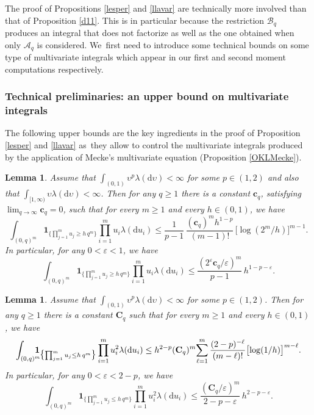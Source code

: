 \documentclass[10pt]{amsart}
\let\mathcal\mathscr
\newtheorem{lemma}[theorem]{Lemma}
\theoremstyle{definition}
\newcommand{\bc}{\boldsymbol{c}}
\newcommand{\dd}{\mathrm{d}}
\newcommand{\ind}{\mathbf{1}}
\newcommand{\cA}{{\ensuremath{\mathcal A}} }
\newcommand{\cB}{{\ensuremath{\mathcal B}} }
\newcommand{\bC}{{\ensuremath{\mathbf C}} }
\let\gep\varepsilon
\let\ups\upsilon
\begin{document}
The proof of Propositions \ref{lesper} and \ref{llavar} are technically more involved than that of Proposition \ref{d11}. This is in particular because the restriction $\cB_q$ produces an integral that does not factorize as well as the one obtained when only $\cA_q$ is considered. We~first need to introduce some technical bounds on some type of multivariate integrals which appear in our first and second moment computations respectively.

\subsubsection{Technical preliminaries: an upper bound on multivariate integrals}

The following upper bounds are the key ingredients in the proof of Proposition \ref{lesper} and \ref{llavar} as~they allow to control the multivariate integrals produced by the application of Mecke's multivariate equation (Proposition \ref{OKLMecke}).

\begin{lemma}
\label{lem:tailzzz1}
Assume that $\int_{(0,1)} \ups^p \lambda(\dd \ups) <\infty$
for some $p \in (1,2)$ and also that $\int_{[1,\infty)} \ups \lambda(\dd \ups)\!<\!\infty$. Then for any $q\!\geq\!1$ there is
a constant $\bc_q$, satisfying $\lim_{q\to\infty} \bc_q\!=\!0$,
such that for every $m\geq 1$ and every $h\in (0,1)$, we have
\begin{equation}
\label{firstline1}
\int_{(0,q)^m} \ind_{\bigl\{\prod^m_{j=1}u_j \ge h\, q^m\bigr\}} \prod_{i=1}^m u_i \lambda(\dd u_i) \le \frac{1}{p-1}\,
\frac{ (\bc_q)^m h^{1-p} }{(m-1)!}\, \bigl[ \log (2^m/h)\bigr]^{m-1}.
\end{equation}
In particular, for any $0< \gep < 1$, we have
\begin{equation}
\label{secondline}
\int_{(0,q)^m} \ind_{\bigl\{\prod^m_{j=1}u_j \ge h \, q^m\bigr\}} \prod_{i=1}^m u_i \lambda(\dd u_i) \le \frac{ (2^{\gep}\bc_q /\gep)^{m} }{p-1} \, h^{1-p-\gep}.
\end{equation}
\end{lemma}

\begin{lemma}
\label{lem:tailzzz2}
Assume that $\int_{(0,1)} \ups^p \lambda(\dd \ups) <\infty$
for some $p \in (1,2)$. Then for any $q\geq 1$ there is
a constant $\bC_q$
such that for every $m\geq 1$ and every $h\in (0,1)$, we have
\begin{equation}
\label{firstline2}
\int_{(0,q)^m} \hspace*{-3mm}\ind_{\bigl\{\prod^m_{j=1}u_j \le h\, q^m\bigr\}} \prod_{i=1}^m u_i^2 \lambda(\dd u_i) \le
h^{2-p}  (\bC_q)^{m}\!\sum_{\ell=1}^{m}\frac{(2-p)^{-\ell}}{(m-\ell)!} \bigl[\log (1/h)\bigr]^{m-\ell}.
\end{equation}
In particular, for any $0< \gep < 2-p$, we have
\begin{equation}
\label{thirdline}
\int_{(0,q)^m} \ind_{\bigl\{\prod^m_{j=1}u_j \le h\, q^m\bigr\}} \prod_{i=1}^m u^2_i \lambda(\dd u_i) \le \frac{ (\bC_q/\gep)^m }{2- p-\gep} \, h^{2-p-\gep}.
\end{equation}
\end{lemma}
\end{document}
